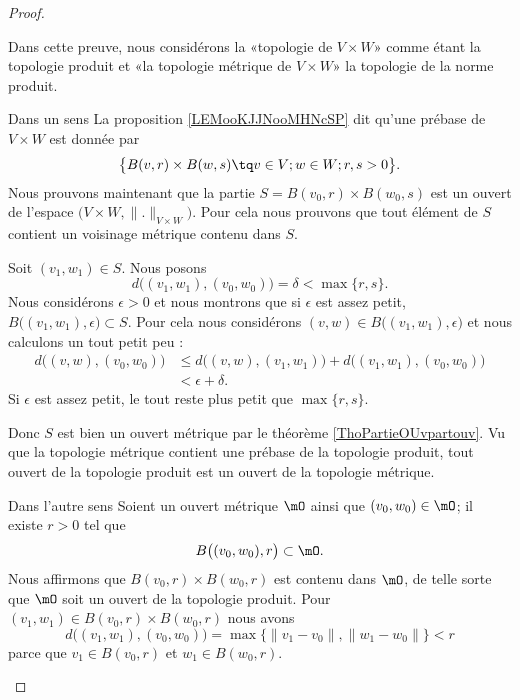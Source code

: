 \begin{proof}
\begin{subproof}
    Dans cette preuve, nous considérons la «topologie de \( V\times W\)» comme étant la topologie produit et «la topologie métrique de \( V\times W\)» la topologie de la norme produit.
    \begin{subproof}
        \item[Dans un sens]
            La proposition \ref{LEMooKJJNooMHNcSP} dit qu'une prébase de \( V\times W\) est donnée par 
            \begin{equation}
                \big\{   B(v,r)\times B(w,s)\tq v\in V;w\in W;r,s>0   \big\}.
            \end{equation}
            Nous prouvons maintenant que la partie \( S= B(v_0,r)\times B(w_0,s)\) est un ouvert de l'espace \( \big( V\times W,\| . \|_{V\times W} \big)\). Pour cela nous prouvons que tout élément de \( S\) contient un voisinage métrique contenu dans \( S\).

            Soit \( (v_1,w_1)\in S\). Nous posons
            \begin{equation}
                d\big( (v_1,w_1), (v_0,w_0) \big)=\delta<\max\{ r,s \}.
            \end{equation}
            Nous considérons \( \epsilon>0\) et nous montrons que si \( \epsilon\) est assez petit, \( B\big( (v_1,w_1),\epsilon \big)\subset S\). Pour cela nous considérons \( (v,w)\in B\big( (v_1,w_1),\epsilon \big)\) et nous calculons un tout petit peu :
            \begin{subequations}
                \begin{align}
                    d\big( (v,w),(v_0,w_0) \big)&\leq d\big( (v,w),(v_1,w_1) \big)+d\big( (v_1,w_1),(v_0,w_0) \big)\\
                    &<\epsilon+\delta.
                \end{align}
            \end{subequations}
            Si \( \epsilon\) est assez petit, le tout reste plus petit que \( \max\{ r,s \}\).

            Donc \( S\) est bien un ouvert métrique par le théorème \ref{ThoPartieOUvpartouv}. Vu que la topologie métrique contient une prébase de la topologie produit, tout ouvert de la topologie produit est un ouvert de la topologie métrique.
        \item[Dans l'autre sens]
            Soient un ouvert métrique \( \mO\) ainsi que \( (v_0,w_0)\in \mO\); il existe \( r>0\) tel que
            \begin{equation}
                B\big( (v_0,w_0),r \big)\subset \mO.
            \end{equation}
            Nous affirmons que \( B(v_0,r)\times B(w_0,r)\) est contenu dans \( \mO\), de telle sorte que \( \mO\) soit un ouvert de la topologie produit. Pour \( (v_1,w_1)\in B(v_0,r)\times B(w_0,r)\) nous avons
            \begin{equation}
                    d\big( (v_1,w_1),(v_0,w_0) \big)=\max\{ \| v_1-v_0 \|,\| w_1-w_0 \| \}<r
            \end{equation}
            parce que \( v_1\in B(v_0,r)\) et \( w_1\in B(w_0,r)\).


\end{subproof}
\end{subproof}
\end{proof}
